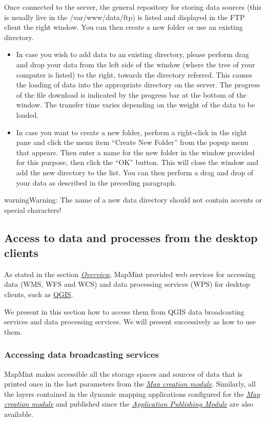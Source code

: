 \documentclass[letterpaper,10pt,english]{sphinxmanual}
\begin{document}
Once connected to the server, the general repository for storing data sources (this is usually live in the /var/www/data/ftp) is listed and displayed in the FTP client the right window. You can then create a new folder or use an existing directory.
\begin{itemize}
\item {} 
In case you wish to add data to an existing directory, please perform drag and drop your data from the left side of the window (where the tree of your computer is listed) to the right, towards the directory referred. This causes the loading of data into the appropriate directory on the server. The progress of the file download is indicated by the progress bar at the bottom of the window. The transfer time varies depending on the weight of the data to be loaded.

\item {} 
In case you want to create a new folder, perform a right-click in the right pane and click the menu item ``Create New Folder'' from the popup menu that appears. Then enter a name for the new folder in the window provided for this purpose, then click the ``OK'' button. This will close the window and add the new directory to the list. You can then perform a drag and drop of your data as described in the preceding paragraph.

\end{itemize}

\begin{notice}{warning}{Warning:}
The name of a new data directory should not contain accents or special characters!
\end{notice}


\subsection{Access to data and processes from the desktop clients}
\label{introduction/usemapmint:acces-aux-donnees-et-traitements-depuis-des-clients-bureautiques}
As stated in the section {\hyperref[introduction/introduction:userguidegeneral]{\emph{Overview}}}, MapMint provided web services for accessing data (WMS, WFS and WCS) and data processing services (WPS) for desktop clients, such as  \href{http://www.qgis.org}{QGIS}.

We present in this section how to access them from QGIS data broadcasting services and data processing services. We will present successively as how to use them.


\subsubsection{Accessing data broadcasting services}
\label{introduction/usemapmint:acceder-aux-services-de-diffusion-de-donnees}
MapMint makes accessible all the storage spaces and sources of data that is printed once in the last parameters from the {\hyperref[maps/index:maps]{\emph{Map creation module}}}. Similarly, all the layers contained in the dynamic mapping applications configured for the {\hyperref[maps/index:maps]{\emph{Map creation module}}} and published since the {\hyperref[apps/index:apps]{\emph{Application Publishing Module}}} are also available.
\end{document}
